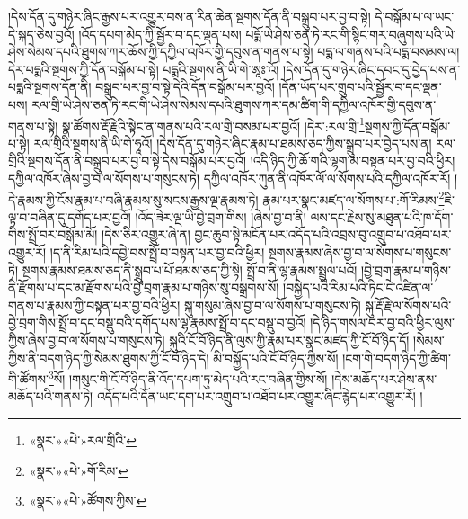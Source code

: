 །དེས་དོན་དུ་གཉེར་ཞིང་རྒྱས་པར་འགྱུར་བས་ན་རིན་ཆེན་སྔགས་དོན་ནི་བསྒྲུབ་པར་བྱ་བ་སྟེ། དེ་བསྒོམ་པ་ལ་ཡང་དེ་སྐད་ཅེས་བྱའོ། །འོད་དཔག་མེད་ཀྱི་སྦྱོར་བ་དང་ལྡན་པས། པདྨོ་ཡེ་ཤེས་ཅན་ཏེ་རང་གི་སྙིང་གར་བཞུགས་པའི་ཡེ་ཤེས་སེམས་དཔའི་ཐུགས་ཀར་ཆོས་ཀྱི་དཀྱིལ་འཁོར་གྱི་དབུས་ན་གནས་པ་སྟེ། པདྨ་ལ་གནས་པའི་པདྨ་བསམས་ལ། དེར་པདྨའི་སྔགས་ཀྱི་དོན་བསྒོམ་པ་སྟེ། པདྨའི་སྔགས་ནི་ཡི་གེ་ཨཱཿ་འོ། །དེས་དོན་དུ་གཉེར་ཞིང་དབང་དུ་བྱེད་པས་ན་པདྨའི་སྔགས་དོན་ནི། བསྒྲུབ་པར་བྱ་བ་སྟེ་དེའི་དོན་བསྒོམ་པར་བྱའོ། །དོན་ཡོད་པར་གྲུབ་པའི་སྦྱོར་བ་དང་ལྡན་པས། རལ་གྲི་ཡེ་ཤེས་ཅན་ཏེ་རང་གི་ཡེ་ཤེས་སེམས་དཔའི་ཐུགས་ཀར་དམ་ཚིག་གི་དཀྱིལ་འཁོར་གྱི་དབུས་ན་གནས་པ་སྟེ། སྣ་ཚོགས་རྡོ་རྗེའི་སྟེང་ན་གནས་པའི་རལ་གྲི་བསམ་པར་བྱའོ། །དེར་:རལ་གྲི་\footnote{«སྣར་»«པེ་»རལ་གྲིའི་}སྔགས་ཀྱི་དོན་བསྒོམ་པ་སྟེ། རལ་གྲིའི་སྔགས་ནི་ཡི་གེ་ཧཱའོ། །དེས་དོན་དུ་གཉེར་ཞིང་རྣམ་པ་ཐམས་ཅད་ཀྱིས་སྒྲུབ་པར་བྱེད་པས་ན། རལ་གྲིའི་སྔགས་དོན་ནི་བསྒྲུབ་པར་བྱ་བ་སྟེ་དེས་བསྒོམ་པར་བྱའོ། །འདི་ཉིད་ཀྱི་ཆོ་གའི་ལྷག་མ་བསྟན་པར་བྱ་བའི་ཕྱིར། དཀྱིལ་འཁོར་ཞེས་བྱ་བ་ལ་སོགས་པ་གསུངས་ཏེ། དཀྱིལ་འཁོར་ཀུན་ནི་འཁོར་ལོ་ལ་སོགས་པའི་དཀྱིལ་འཁོར་རོ། །དེ་རྣམས་ཀྱི་ངོས་རྣམ་པ་བཞི་རྣམས་སུ་སངས་རྒྱས་ལྔ་རྣམས་ཏེ། རྣམ་པར་སྣང་མཛད་ལ་སོགས་པ་:གོ་རིམས་\footnote{«སྣར་»«པེ་»གོ་རིམ་}ཇི་ལྟ་བ་བཞིན་དུ་དགོད་པར་བྱའོ། །འོད་ཟེར་ལྔ་ཡི་བྱེ་བྲག་གིས། །ཞེས་བྱ་བ་ནི། ལས་དང་རྗེས་སུ་མཐུན་པའི་ཁ་དོག་གིས་སྤྲོ་བར་བསྒོམ་མོ། །དེས་ཅིར་འགྱུར་ཞེ་ན། བྱང་ཆུབ་སྟེ་མངོན་པར་འདོད་པའི་འབྲས་བུ་འགྲུབ་པ་འཐོབ་པར་འགྱུར་རོ། །ད་ནི་རིམ་པའི་དབྱེ་བས་སྤྲོ་བ་བསྟན་པར་བྱ་བའི་ཕྱིར། སྔགས་རྣམས་ཞེས་བྱ་བ་ལ་སོགས་པ་གསུངས་ཏེ། སྔགས་རྣམས་ཐམས་ཅད་ནི་སྒྲུབ་པ་པོ་ཐམས་ཅད་ཀྱི་སྟེ། སྤྲོ་བ་ནི་ལྷ་རྣམས་སྤྲུལ་པའོ། །བྱེ་བྲག་རྣམ་པ་གཉིས་ནི་རྫོགས་པ་དང་མ་རྫོགས་པའི་བྱེ་བྲག་རྣམ་པ་གཉིས་སུ་བསྒྲགས་སོ། །བསྐྱེད་པའི་རིམ་པའི་ཏིང་ངེ་འཛིན་ལ་གནས་པ་རྣམས་ཀྱི་བསྟན་པར་བྱ་བའི་ཕྱིར། སྐུ་གསུམ་ཞེས་བྱ་བ་ལ་སོགས་པ་གསུངས་ཏེ། སྐུ་རྡོ་རྗེ་ལ་སོགས་པའི་བྱེ་བྲག་གིས་སྤྲོ་བ་དང་བསྡུ་བའི་དགོད་པས་ལྷ་རྣམས་སྤྲོ་བ་དང་བསྡུ་བ་བྱའོ། །དེ་ཉིད་གསལ་བར་བྱ་བའི་ཕྱིར་ལུས་ཀྱིས་ཞེས་བྱ་བ་ལ་སོགས་པ་གསུངས་ཏེ། སྐུའི་ངོ་བོ་ཉིད་ནི་ལུས་ཀྱི་རྣམ་པར་སྣང་མཛད་ཀྱི་ངོ་བོ་ཉིད་དོ། །སེམས་ཀྱིས་ནི་བདག་ཉིད་ཀྱི་སེམས་ཐུགས་ཀྱི་ངོ་བོ་ཉིད་དེ། མི་བསྐྱོད་པའི་ངོ་བོ་ཉིད་ཀྱིས་སོ། །ངག་གི་བདག་ཉིད་ཀྱི་ཚིག་གི་ཚོགས་\footnote{«སྣར་»«པེ་»ཚོགས་ཀྱིས་}སོ། །གསུང་གི་ངོ་བོ་ཉིད་ནི་འོད་དཔག་ཏུ་མེད་པའི་རང་བཞིན་གྱིས་སོ། །དེས་མཆོད་པར་ཤེས་ནས་མཆོད་པའི་གནས་ཏེ། འདོད་པའི་དོན་ཡང་དག་པར་འགྲུབ་པ་འཐོབ་པར་འགྱུར་ཞིང་རྙེད་པར་འགྱུར་རོ། །
